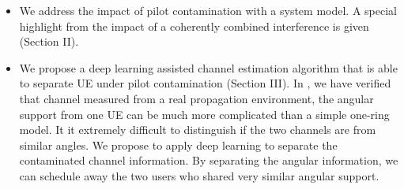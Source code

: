 \begin{itemize}

\item We address the impact of pilot contamination with a system model. A special highlight from the impact of a coherently combined interference is given (Section II). 

\item We propose a deep learning assisted channel estimation algorithm that is able to separate UE under pilot contamination (Section III). In \cite{Chen2018pilot}, we have verified that channel measured from a real propagation environment, the angular support from one UE can be much more complicated than a simple one-ring model. It it extremely difficult to distinguish if the two channels are from similar angles. %
We propose to apply deep learning to separate the contaminated channel information. By separating the angular information, we can schedule away the two users who shared very similar angular support.


\end{itemize}
